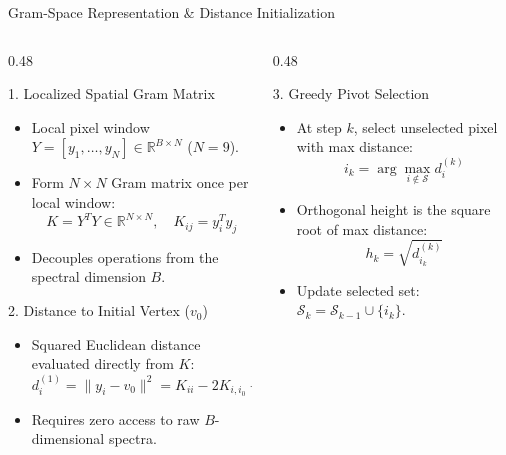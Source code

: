 \documentclass[aspectratio=169, 10pt]{beamer}
\begin{document}
\begin{frame}{Gram-Space Representation \& Distance Initialization}
  \begin{columns}[T]
    \begin{column}{0.48\textwidth}
      \begin{block}{1. Localized Spatial Gram Matrix}
        \footnotesize
        \begin{itemize}\setlength{\itemsep}{2pt}
          \item Local pixel window $Y = [y_1, \dots, y_N] \in \mathbb{R}^{B \times N}$ ($N=9$).
          \item Form $N \times N$ Gram matrix once per local window:
          $$K = Y^T Y \in \mathbb{R}^{N \times N}, \quad K_{ij} = y_i^T y_j$$
          \item Decouples operations from the spectral dimension $B$.
        \end{itemize}
      \end{block}

      \begin{block}{2. Distance to Initial Vertex ($v_0$)}
        \footnotesize
        \begin{itemize}\setlength{\itemsep}{2pt}
          \item Squared Euclidean distance evaluated directly from $K$:
          $$d_i^{(1)} = \|y_i - v_0\|^2 = K_{ii} - 2 K_{i, i_0} + K_{i_0, i_0}$$
          \item Requires zero access to raw $B$-dimensional spectra.
        \end{itemize}
      \end{block}
    \end{column}

    \begin{column}{0.48\textwidth}
      \begin{block}{3. Greedy Pivot Selection}
        \footnotesize
        \begin{itemize}\setlength{\itemsep}{2pt}
          \item At step $k$, select unselected pixel with max distance:
          $$i_k = \arg\max_{i \notin \mathcal{S}} d_i^{(k)}$$
          \item Orthogonal height is the square root of max distance:
          $$h_k = \sqrt{d_{i_k}^{(k)}}$$
          \item Update selected set: $\mathcal{S}_k = \mathcal{S}_{k-1} \cup \{i_k\}$.
        \end{itemize}
      \end{block}


\end{column}
\end{columns}
\end{frame}
\end{document}
